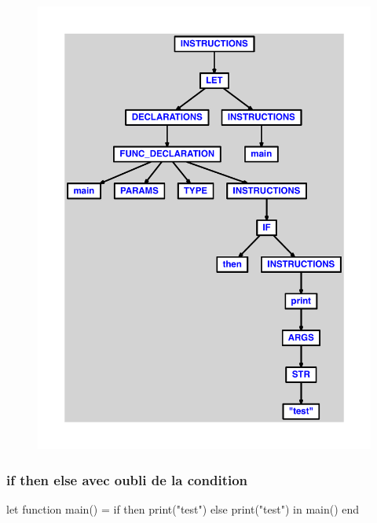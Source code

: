 \documentclass{article}
\begin{document}
\begin{figure}[H]\centering\includegraphics[max width=\textwidth]{ast/ast_244.pdf}\end{figure}\subsubsection{if then else avec oubli de la condition}
\begin{verbatimtab}
let
	function main() =
		if then
			print("test")
		else
			print("test")
in main() end
\end{verbatimtab}
\end{document}

